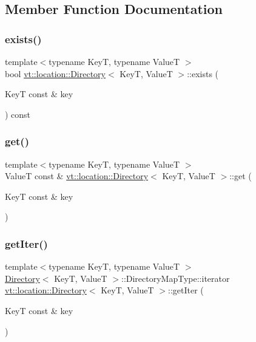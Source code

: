 \subsection{Member Function Documentation}
\mbox{\label{structvt_1_1location_1_1_directory_aec1cbff73a72fb1be6825bd048f69601}} 
\subsubsection{\texorpdfstring{exists()}{exists()}}
{\footnotesize\ttfamily template$<$typename KeyT, typename ValueT $>$ \\
bool \hyperlink{structvt_1_1location_1_1_directory}{vt\+::location\+::\+Directory}$<$ KeyT, ValueT $>$\+::exists (\begin{DoxyParamCaption}\item[{KeyT const \&}]{key }\end{DoxyParamCaption}) const}

\mbox{\label{structvt_1_1location_1_1_directory_a7d3271252e69fd8c2c16c702b032bdc8}} 
\subsubsection{\texorpdfstring{get()}{get()}}
{\footnotesize\ttfamily template$<$typename KeyT, typename ValueT $>$ \\
ValueT const  \& \hyperlink{structvt_1_1location_1_1_directory}{vt\+::location\+::\+Directory}$<$ KeyT, ValueT $>$\+::get (\begin{DoxyParamCaption}\item[{KeyT const \&}]{key }\end{DoxyParamCaption})}

\mbox{\label{structvt_1_1location_1_1_directory_ae54fc683860dbfd4145012b93332d70c}} 
\subsubsection{\texorpdfstring{get\+Iter()}{getIter()}}
{\footnotesize\ttfamily template$<$typename KeyT, typename ValueT $>$ \\
\hyperlink{structvt_1_1location_1_1_directory}{Directory}$<$ KeyT, ValueT $>$\+::Directory\+Map\+Type\+::iterator \hyperlink{structvt_1_1location_1_1_directory}{vt\+::location\+::\+Directory}$<$ KeyT, ValueT $>$\+::get\+Iter (\begin{DoxyParamCaption}\item[{KeyT const \&}]{key }\end{DoxyParamCaption})}

